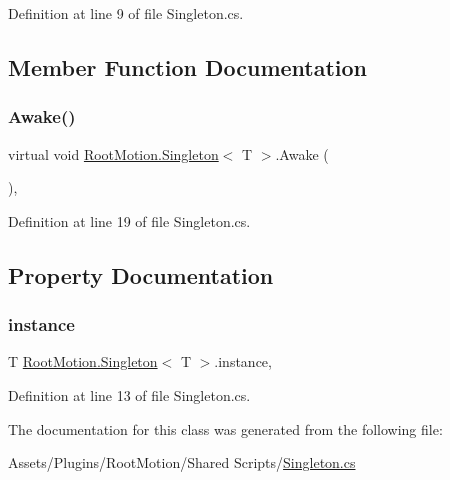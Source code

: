 Definition at line 9 of file Singleton.\+cs.



\subsection{Member Function Documentation}
\mbox{\label{class_root_motion_1_1_singleton_a7d30a1c590d4d36f7b137c4543389013}} 
\subsubsection{\texorpdfstring{Awake()}{Awake()}}
{\footnotesize\ttfamily virtual void \mbox{\hyperlink{class_root_motion_1_1_singleton}{Root\+Motion.\+Singleton}}$<$ T $>$.Awake (\begin{DoxyParamCaption}{ }\end{DoxyParamCaption})\hspace{0.3cm}{\ttfamily [protected]}, {\ttfamily [virtual]}}



Definition at line 19 of file Singleton.\+cs.



\subsection{Property Documentation}
\mbox{\label{class_root_motion_1_1_singleton_acfc7a495a0c8c98ce5f48e54a353c9de}} 
\subsubsection{\texorpdfstring{instance}{instance}}
{\footnotesize\ttfamily T \mbox{\hyperlink{class_root_motion_1_1_singleton}{Root\+Motion.\+Singleton}}$<$ T $>$.instance\hspace{0.3cm}{\ttfamily [static]}, {\ttfamily [get]}}



Definition at line 13 of file Singleton.\+cs.



The documentation for this class was generated from the following file\+:\begin{DoxyCompactItemize}
\item 
Assets/\+Plugins/\+Root\+Motion/\+Shared Scripts/\mbox{\hyperlink{_plugins_2_root_motion_2_shared_01_scripts_2_singleton_8cs}{Singleton.\+cs}}\end{DoxyCompactItemize}
